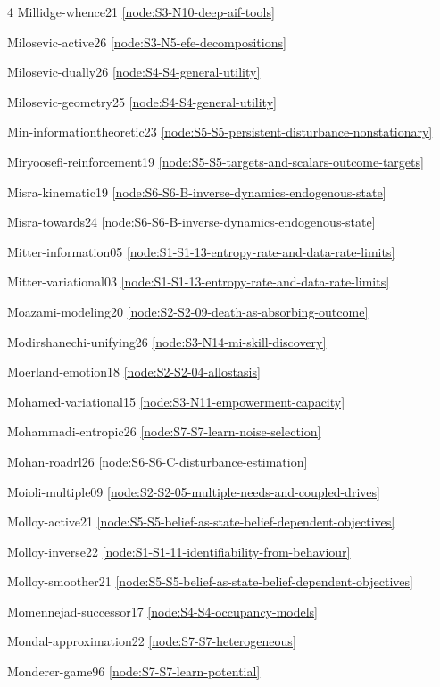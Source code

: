 \documentclass[10pt]{article}
\begin{document}
{\begin{multicols}{4}
Millidge-whence21 \hfill \ref{node:S3-N10-deep-aif-tools}\par
Milosevic-active26 \hfill \ref{node:S3-N5-efe-decompositions}\par
Milosevic-dually26 \hfill \ref{node:S4-S4-general-utility}\par
Milosevic-geometry25 \hfill \ref{node:S4-S4-general-utility}\par
Min-informationtheoretic23 \hfill \ref{node:S5-S5-persistent-disturbance-nonstationary}\par
Miryoosefi-reinforcement19 \hfill \ref{node:S5-S5-targets-and-scalars-outcome-targets}\par
Misra-kinematic19 \hfill \ref{node:S6-S6-B-inverse-dynamics-endogenous-state}\par
Misra-towards24 \hfill \ref{node:S6-S6-B-inverse-dynamics-endogenous-state}\par
Mitter-information05 \hfill \ref{node:S1-S1-13-entropy-rate-and-data-rate-limits}\par
Mitter-variational03 \hfill \ref{node:S1-S1-13-entropy-rate-and-data-rate-limits}\par
Moazami-modeling20 \hfill \ref{node:S2-S2-09-death-as-absorbing-outcome}\par
Modirshanechi-unifying26 \hfill \ref{node:S3-N14-mi-skill-discovery}\par
Moerland-emotion18 \hfill \ref{node:S2-S2-04-allostasis}\par
Mohamed-variational15 \hfill \ref{node:S3-N11-empowerment-capacity}\par
Mohammadi-entropic26 \hfill \ref{node:S7-S7-learn-noise-selection}\par
Mohan-roadrl26 \hfill \ref{node:S6-S6-C-disturbance-estimation}\par
Moioli-multiple09 \hfill \ref{node:S2-S2-05-multiple-needs-and-coupled-drives}\par
Molloy-active21 \hfill \ref{node:S5-S5-belief-as-state-belief-dependent-objectives}\par
Molloy-inverse22 \hfill \ref{node:S1-S1-11-identifiability-from-behaviour}\par
Molloy-smoother21 \hfill \ref{node:S5-S5-belief-as-state-belief-dependent-objectives}\par
Momennejad-successor17 \hfill \ref{node:S4-S4-occupancy-models}\par
Mondal-approximation22 \hfill \ref{node:S7-S7-heterogeneous}\par
Monderer-game96 \hfill \ref{node:S7-S7-learn-potential}\par

\end{multicols}}
\end{document}
